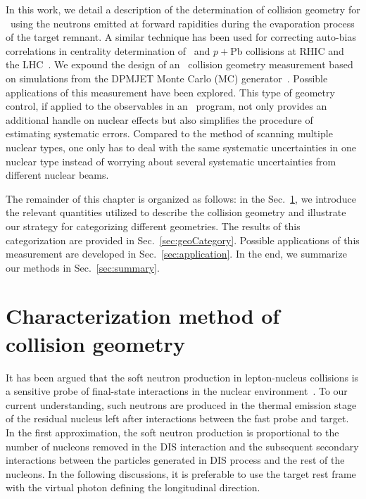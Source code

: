 In this work, we detail a description of the determination of collision geometry
for \eA\ using the neutrons emitted at forward rapidities during the evaporation
process of the target remnant. A similar technique has been used for correcting
auto-bias correlations in centrality determination of \dA\ and $p+$Pb collisions
at RHIC and the LHC~\cite{Adare:2013nff,Toia:2014wia}. We expound the design of
an \eA\ collision geometry measurement based on simulations from the DPMJET
Monte Carlo (MC) generator~\cite{Roesler:2000he}. Possible applications of this
measurement have been explored. This type of geometry control, if applied to the
observables in an \eA\ program, not only provides an additional handle on
nuclear effects but also simplifies the procedure of estimating systematic
errors. Compared to the method of scanning multiple nuclear types, one only has
to deal with the same systematic uncertainties in one nuclear type instead of
worrying about several systematic uncertainties from different nuclear beams.


The remainder of this chapter is organized as follows: in the Sec.~\ref{sec:geoDef}, we introduce the relevant
quantities utilized to describe the collision geometry and illustrate our
strategy for categorizing different geometries. The results of this categorization
are provided in Sec.~\ref{sec:geoCategory}. Possible applications of this
measurement are developed in Sec.~\ref{sec:application}. In the end, we
summarize our methods in Sec.~\ref{sec:summary}.




\section{Characterization method of collision geometry} \label{sec:geoDef}

It has been argued that the soft neutron production in lepton-nucleus collisions is
a sensitive probe of final-state interactions in the nuclear
environment~\cite{Strikman:1998cc,White:2010tu}. To our current understanding, such neutrons
are produced in the thermal emission stage of the residual nucleus left after
interactions between the fast probe and target. In the first approximation, the
soft neutron production is proportional to the number of nucleons removed in the
DIS interaction and the subsequent secondary interactions between the
particles generated in DIS process and the rest of the nucleons. In the
following discussions, it is preferable to use the target rest frame with the virtual
photon defining the longitudinal direction.

